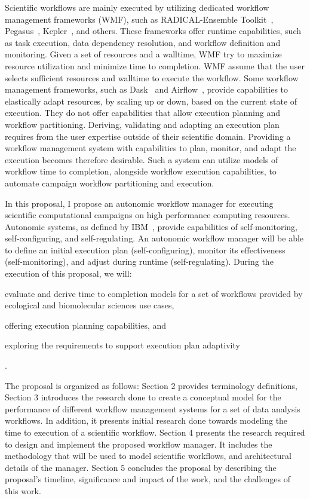 Scientific workflows are mainly executed by utilizing dedicated workflow 
management frameworks (WMF), such as RADICAL-Ensemble 
Toolkit~\cite{balasubramanian2018harnessing}, Pegasus~\cite{deelman2015pegasus}, 
Kepler~\cite{ludascher2006concurrency}, and others. These frameworks offer 
runtime capabilities, such as task execution, data dependency resolution, and 
workflow definition and monitoring. Given a set of resources and a walltime, 
WMF try to maximize resource utilization and minimize time to completion. WMF 
assume that the user selects sufficient resources and walltime to execute the 
workflow. Some workflow management frameworks, such as 
Dask~\cite{rocklin2015dask} and Airflow~\cite{airflow}, provide capabilities to 
elastically adapt resources, by scaling up or down, based on the current state 
of execution. They do not offer capabilities that allow execution planning and 
workflow partitioning. Deriving, validating and adapting an execution plan 
requires from the user expertise outside of their scientific domain. Providing 
a workflow management system with capabilities to plan, monitor, and adapt the 
execution becomes therefore desirable. Such a system can utilize models of 
workflow time to completion, alongside workflow execution capabilities, to 
automate campaign workflow partitioning and execution.

In this proposal, I propose an autonomic workflow manager for executing 
scientific computational campaigns on high performance computing resources. 
Autonomic systems, as defined by IBM~\cite{ibm2005autonomic}, provide 
capabilities of self-monitoring, self-configuring, and self-regulating. An 
autonomic workflow manager will be able to define an initial execution plan 
(self-configuring), monitor its effectiveness (self-monitoring), and adjust 
during runtime (self-regulating). During the execution of this proposal, we 
will:
\begin{inparaenum}[1)]
\item evaluate and derive time to completion models for a set of workflows 
provided by ecological and biomolecular sciences use cases,
\item offering execution planning capabilities, and 
\item exploring the requirements to support execution plan adaptivity
\end{inparaenum}.

The proposal is organized as follows: Section 2 provides terminology definitions, 
Section 3 introduces the research done to create a conceptual model for the 
performance of different workflow management systems for a set of data analysis 
workflows. In addition, it presents initial research done towards modeling the 
time to execution of a scientific workflow. Section 4 presents the research 
required to design and implement the proposed workflow manager. It includes the 
methodology that will be used to model scientific workflows, and architectural 
details of the manager. Section 5 concludes the proposal by describing the 
proposal's timeline, significance and impact of the work, and the challenges of 
this work.
